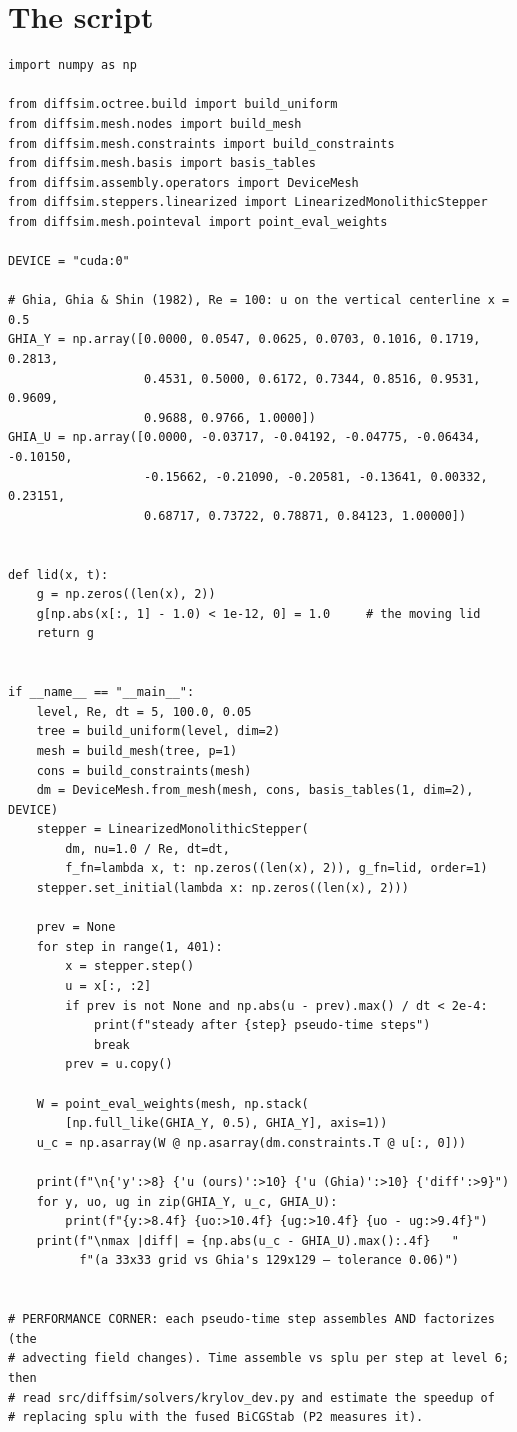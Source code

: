 \section*{The script}
\begin{lstlisting}
import numpy as np

from diffsim.octree.build import build_uniform
from diffsim.mesh.nodes import build_mesh
from diffsim.mesh.constraints import build_constraints
from diffsim.mesh.basis import basis_tables
from diffsim.assembly.operators import DeviceMesh
from diffsim.steppers.linearized import LinearizedMonolithicStepper
from diffsim.mesh.pointeval import point_eval_weights

DEVICE = "cuda:0"

# Ghia, Ghia & Shin (1982), Re = 100: u on the vertical centerline x = 0.5
GHIA_Y = np.array([0.0000, 0.0547, 0.0625, 0.0703, 0.1016, 0.1719, 0.2813,
                   0.4531, 0.5000, 0.6172, 0.7344, 0.8516, 0.9531, 0.9609,
                   0.9688, 0.9766, 1.0000])
GHIA_U = np.array([0.0000, -0.03717, -0.04192, -0.04775, -0.06434, -0.10150,
                   -0.15662, -0.21090, -0.20581, -0.13641, 0.00332, 0.23151,
                   0.68717, 0.73722, 0.78871, 0.84123, 1.00000])


def lid(x, t):
    g = np.zeros((len(x), 2))
    g[np.abs(x[:, 1] - 1.0) < 1e-12, 0] = 1.0     # the moving lid
    return g


if __name__ == "__main__":
    level, Re, dt = 5, 100.0, 0.05
    tree = build_uniform(level, dim=2)
    mesh = build_mesh(tree, p=1)
    cons = build_constraints(mesh)
    dm = DeviceMesh.from_mesh(mesh, cons, basis_tables(1, dim=2), DEVICE)
    stepper = LinearizedMonolithicStepper(
        dm, nu=1.0 / Re, dt=dt,
        f_fn=lambda x, t: np.zeros((len(x), 2)), g_fn=lid, order=1)
    stepper.set_initial(lambda x: np.zeros((len(x), 2)))

    prev = None
    for step in range(1, 401):
        x = stepper.step()
        u = x[:, :2]
        if prev is not None and np.abs(u - prev).max() / dt < 2e-4:
            print(f"steady after {step} pseudo-time steps")
            break
        prev = u.copy()

    W = point_eval_weights(mesh, np.stack(
        [np.full_like(GHIA_Y, 0.5), GHIA_Y], axis=1))
    u_c = np.asarray(W @ np.asarray(dm.constraints.T @ u[:, 0]))

    print(f"\n{'y':>8} {'u (ours)':>10} {'u (Ghia)':>10} {'diff':>9}")
    for y, uo, ug in zip(GHIA_Y, u_c, GHIA_U):
        print(f"{y:>8.4f} {uo:>10.4f} {ug:>10.4f} {uo - ug:>9.4f}")
    print(f"\nmax |diff| = {np.abs(u_c - GHIA_U).max():.4f}   "
          f"(a 33x33 grid vs Ghia's 129x129 — tolerance 0.06)")


# PERFORMANCE CORNER: each pseudo-time step assembles AND factorizes (the
# advecting field changes). Time assemble vs splu per step at level 6; then
# read src/diffsim/solvers/krylov_dev.py and estimate the speedup of
# replacing splu with the fused BiCGStab (P2 measures it).
\end{lstlisting}

